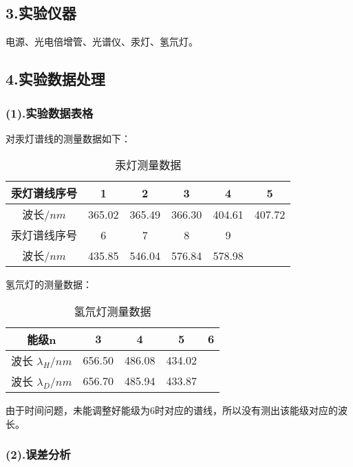 \documentclass[utf8]{ctexart}
\begin{document}
	\subsection*{3.实验仪器}
	电源、光电倍增管、光谱仪、汞灯、氢氘灯。
    \vspace{4em}
	
	\subsection*{4.实验数据处理}
	\subsubsection*{(1).实验数据表格}
    对汞灯谱线的测量数据如下：
	\begin{table}[htbp]
        \centering
        \caption{汞灯测量数据}
        \begin{tabular}{|c|c|c|c|c|c|}
            \hline
            汞灯谱线序号 & 1 & 2 & 3 & 4 & 5 \\
            \hline
            波长$/\unit{nm}$ & 365.02 & 365.49 & 366.30 & 404.61 & 407.72 \\
            \hline
            汞灯谱线序号 & 6 & 7 & 8 & 9 & \\
            \hline
            波长$/\unit{nm}$ & 435.85 & 546.04 & 576.84 & 578.98 & \\
            \hline
            
        \end{tabular}
    \end{table}

    氢氘灯的测量数据：

    \begin{table}[htbp]
        \centering
        \caption{氢氘灯测量数据}
        \begin{tabular}{|c|c|c|c|c|}
            \hline
            能级n & 3 & 4 & 5 & 6 \\
            \hline
            波长 $\lambda_H/\unit{nm}$ & 656.50 & 486.08 & 434.02 & \\
            \hline
            波长 $\lambda_D/\unit{nm}$ & 656.70 & 485.94 & 433.87 & \\
            \hline
        \end{tabular}
    \end{table}
	由于时间问题，未能调整好能级为6时对应的谱线，所以没有测出该能级对应的波长。
	\subsubsection*{(2).误差分析}
	
\end{document}
